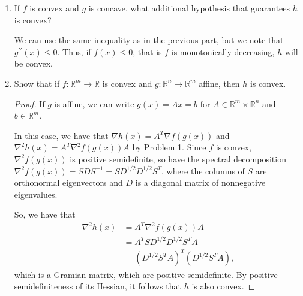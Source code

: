 \documentclass[11pt]{amsart}
\begin{document}
\begin{enumerate}
\begin{enumerate}
  With certain conditions, we can ensure that $h$ is convex. $h$ is convex if
  and only if
  $f^\prime\left(g(x)\right)g^{\prime\prime}(x) \geq
  -f^{\prime\prime}\left(g(x)\right)\left[g^\prime(x)\right]^2$ for all $x$.
  \begin{proof}
    We have that
    $h^{\prime\prime}(x) = f^\prime\left(g(x)\right)g^{\prime\prime}(x) +
    f^{\prime\prime}\left(g(x)\right)\left[g^\prime(x)\right]^2$, so
    \begin{equation*}
      \text{$h$ is convex} \Leftrightarrow
      h^{\prime\prime}(x) \geq 0 \Leftrightarrow
      f^\prime\left(g(x)\right)g^{\prime\prime}(x) \geq
      -f^{\prime\prime}\left(g(x)\right)\left[g^\prime(x)\right]^2
    \end{equation*}
  \end{proof}
  
  Since $f$ and $g$ are convex, we have that
  $f^{\prime\prime}\left(g(x)\right)\left[g^\prime(x)\right]^2 \geq 0$ and
  $g^{\prime\prime}(x) \geq 0$. Thus, one way to ensure that this inequality
  holds is for $f^\prime(x) \geq 0$, that is, for $f$ be monotonically
  increasing.
  
\item If $f$ is convex and $g$ is concave, what additional hypothesis that guarantees $h$ is convex?

  We can use the same inequality as in the previous part, but we note that
  $g^{\prime\prime}(x) \leq 0$. Thus, if $f(x) \leq 0$, that is $f$ is
  monotonically decreasing, $h$ will be convex.

\item Show that if $f: \mathbb{R}^m \rightarrow \mathbb{R}$ is convex and $g: \mathbb{R}^n \rightarrow \mathbb{R}^m$ affine, then $h$ is convex.

  \begin{proof}
    If $g$ is affine, we can write $g(x) = Ax = b$ for
    $A \in \mathbb{R}^m \times \mathbb{R}^n$ and $b \in \mathbb{R}^m$.
    
    In this case, we have that $\nabla h(x) = A^T\nabla f(g(x))$ and
    $\nabla^2 h(x) = A^T \nabla^2 f(g(x)) A$ by Problem 1. Since $f$ is convex,
    $\nabla^2 f(g(x))$ is positive semidefinite, so have the spectral
    decomposition $\nabla^2 f(g(x)) = SDS^{-1} = SD^{1/2}D^{1/2}S^T$, where the
    columns of $S$ are orthonormal eigenvectors and $D$ is a diagonal matrix of
    nonnegative eigenvalues.

    So, we have that
    \begin{align*}
      \nabla^2 h(x)
      &= A^T \nabla^2 f(g(x)) A \\
      &= A^TSD^{1/2}D^{1/2}S^TA \\
      &= \left(D^{1/2}S^TA\right)^T\left(D^{1/2}S^TA\right),
    \end{align*}
    which is a Gramian matrix, which are positive semidefinite. By positive
    semidefiniteness of its Hessian, it follows that $h$ is also convex.
  \end{proof}
  

\end{enumerate}
\end{enumerate}
\end{document}
